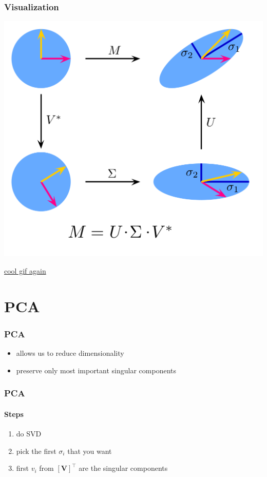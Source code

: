 \documentclass[aspectratio=169]{beamer}
\newcommand{\tpose}[1]{\left[#1\right]^{\! \top} \!\!}
\begin{document}
\begin{frame}
    \frametitle{Visualization}

    \begin{center}
        \includegraphics[height=0.8\textheight]{1024px-Singular-Value-Decomposition.svg.png}
    \end{center}
    \href{https://upload.wikimedia.org/wikipedia/commons/e/e9/Singular_value_decomposition.gif}{cool gif again}
\end{frame}

\section{PCA}

\begin{frame}
    \frametitle{PCA}

    \begin{itemize}
        \item allows us to reduce dimensionality
        \item preserve only most important singular components
    \end{itemize}
\end{frame}

\begin{frame}
    \frametitle{PCA}
    \framesubtitle{Steps}

    \begin{enumerate}
        \item do SVD
        \item pick the first \(\sigma_i\) that you want
        \item first \(v_i\) from \(\tpose{\bm{V}}\) are the singular components
    \end{enumerate}
\end{frame}
\end{document}
